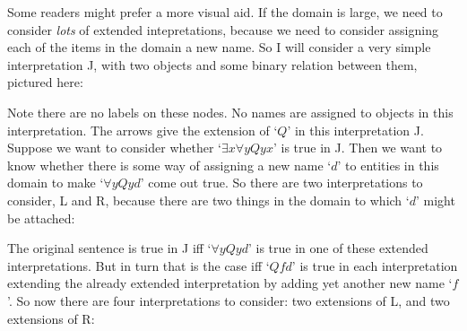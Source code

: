 \begin{earg}
Some readers might prefer a more visual aid. If the domain is large, we need to consider \emph{lots} of extended intepretations, because we need to consider assigning each of the items in the domain a new name. So I will consider a very simple interpretation J, with two objects and some binary relation between them, pictured here: 
\begin{center}
\end{center}
Note there are no labels on these nodes. No names are assigned to objects in this interpretation. The arrows give the extension of `$Q$' in this interpretation J. Suppose we want to consider whether `$\exists x \forall y Qyx$' is true in J. Then we want to know whether there is some way of assigning a new name `$d$' to entities in this domain to make `$\forall y Qyd$' come out true. So there are two interpretations to consider, L and R, because there are two things in the domain to which `$d$' might be attached: 
\begin{center}
	  \qquad {}
\end{center} 
The original sentence is true in J iff `$\forall y Qyd$' is true in one of these extended interpretations. But in turn that is the case iff `$Qfd$' is true in each interpretation extending the already extended interpretation by adding yet another new name `$f$'. So now there are four interpretations to consider: two extensions of L, and two extensions of R:
\begin{center}
	 \begin{tikzpicture}

\end{tikzpicture}
\end{center}
\end{earg}
